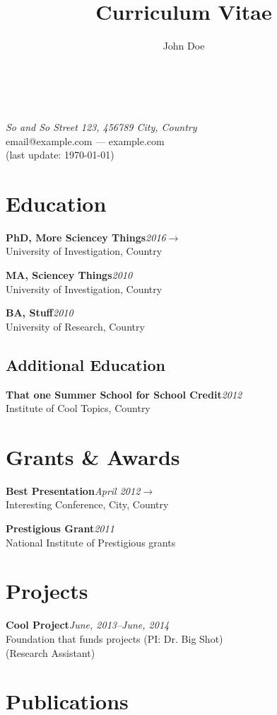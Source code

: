 \documentclass{article}
\makeatletter
\newcommand{\cvcolor}{\color{DodgerBlue4}} %
\renewcommand{\maketitle}{
\begin{center}
{\Huge\theauthor}\\
{\Large \cvcolor{Department of Research, University of Investigation}}\\
{\itshape So and So Street 123, 456789 City, Country}\\
email@example.com --- example.com\\
\vspace{0.25em}
{\color{Gray}(last update: \today)}
\end{center}
}
\makeatother
\begin{document}
\title{Curriculum Vitae} %
\author{John Doe}

\maketitle

\section{Education}

\textbf{PhD, More Sciencey Things}\hfill\emph{2016}$\rightarrow$\\
University of Investigation, Country

\textbf{MA, Sciencey Things}\hfill\emph{2010}\\
University of Investigation, Country

\textbf{BA, Stuff}\hfill\emph{2010}\\
University of Research, Country

\subsection{Additional Education}

\textbf{That one Summer School for School Credit}\hfill\emph{2012}\\
Institute of Cool Topics, Country 

\section{Grants \& Awards}

\textbf{Best Presentation}\hfill \emph{April 2012}$\rightarrow$\\
Interesting Conference, City, Country

\textbf{Prestigious Grant}\hfill \emph{2011}\\
National Institute of Prestigious grants

\section{Projects}

\textbf{Cool Project}\hfill \emph{June, 2013--June, 2014}\\
Foundation that funds projects (PI: Dr. Big Shot)\\
(Research Assistant)

\section{Publications}
\end{document}
